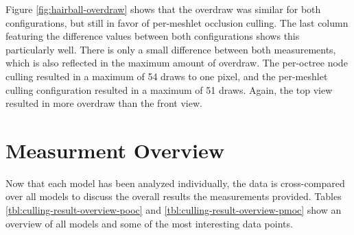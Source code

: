 \noindent
Figure \ref{fig:hairball-overdraw} shows that the overdraw was similar for both configurations, 
but still in favor of per-meshlet occlusion culling. The last column featuring the difference 
values between both configurations shows this particularly well. There is only a small difference 
between both measurements, which is also reflected in the maximum amount of overdraw. The 
per-octree node culling resulted in a maximum of 54 draws to one pixel, and the per-meshlet 
culling configuration resulted in a maximum of 51 draws. Again, the top view resulted in more 
overdraw than the front view.

\clearpage




\section*{Measurment Overview}

Now that each model has been analyzed individually, the data is cross-compared over all models to 
discuss the overall results the measurements provided. Tables \ref{tbl:culling-result-overview-pooc} 
and \ref{tbl:culling-result-overview-pmoc} show an overview of all models and some of the most 
interesting data points. 

